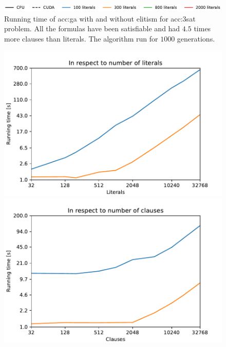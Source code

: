 \begin{figure}[ht!]
    \begin{minipage}[t]{0.7\textwidth}
        \includegraphics[width=\textwidth]{img/runs/time_ga_legend.pdf}
    \end{minipage}

    \caption[Genetic algorithm running time with and without elitism]{Running time of \acrlong{acc:ga} with and without elitism for \acrshort{acc:3sat} problem. All the formulas have been satisfiable and had $4.5$ times more clauses than literals. The algorithm run for $1000$ generations.}
    \label{meas:garuntime}
\end{figure}

\begin{figure}[ht!]
    \centering
    \begin{minipage}[t]{0.9\textwidth}
        \begin{minipage}[t]{0.48\textwidth}
            \includegraphics[width=\textwidth]{img/runs/time_ga_varcount.pdf}
        \end{minipage}
        \begin{minipage}[t]{0.48\textwidth}
            \includegraphics[width=\textwidth]{img/runs/time_ga_clausecount.pdf}
        \end{minipage}
    \end{minipage}


\end{figure}
